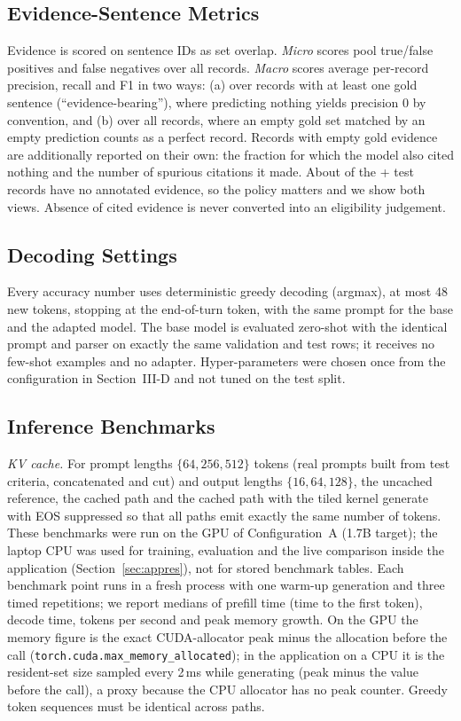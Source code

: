 \subsection{Evidence-Sentence Metrics}
Evidence is scored on sentence IDs as set overlap. \emph{Micro} scores pool true/false positives and false negatives over all records. \emph{Macro} scores average per-record precision, recall and F1 in two ways: (a) over records with at least one gold sentence (``evidence-bearing''), where predicting nothing yields precision 0 by convention, and (b) over all records, where an empty gold set matched by an empty prediction counts as a perfect record. Records with empty gold evidence are additionally reported on their own: the fraction for which the model also cited nothing and the number of spurious citations it made. About \NGoldEmpty{} of the \NGoldNon{}+\NGoldEmpty{} test records have no annotated evidence, so the policy matters and we show both views. Absence of cited evidence is never converted into an eligibility judgement.

\subsection{Decoding Settings}
Every accuracy number uses deterministic greedy decoding (argmax), at most 48 new tokens, stopping at the end-of-turn token, with the same prompt for the base and the adapted model. The base model is evaluated zero-shot with the identical prompt and parser on exactly the same validation and test rows; it receives no few-shot examples and no adapter. Hyper-parameters were chosen once from the configuration in Section~III-D and not tuned on the test split.

\subsection{Inference Benchmarks}
\emph{KV cache.} For prompt lengths $\{64,256,512\}$ tokens (real prompts built from test criteria, concatenated and cut) and output lengths $\{16,64,128\}$, the uncached reference, the cached path and the cached path with the tiled kernel generate with EOS suppressed so that all paths emit exactly the same number of tokens. These benchmarks were run on the GPU of Configuration~A (1.7B target); the laptop CPU was used for training, evaluation and the live comparison inside the application (Section~\ref{sec:appres}), not for stored benchmark tables. Each benchmark point runs in a fresh process with one warm-up generation and three timed repetitions; we report medians of prefill time (time to the first token), decode time, tokens per second and peak memory growth. On the GPU the memory figure is the exact CUDA-allocator peak minus the allocation before the call (\texttt{torch.cuda.max\_memory\_allocated}); in the application on a CPU it is the resident-set size sampled every 2\,ms while generating (peak minus the value before the call), a proxy because the CPU allocator has no peak counter. Greedy token sequences must be identical across paths.

